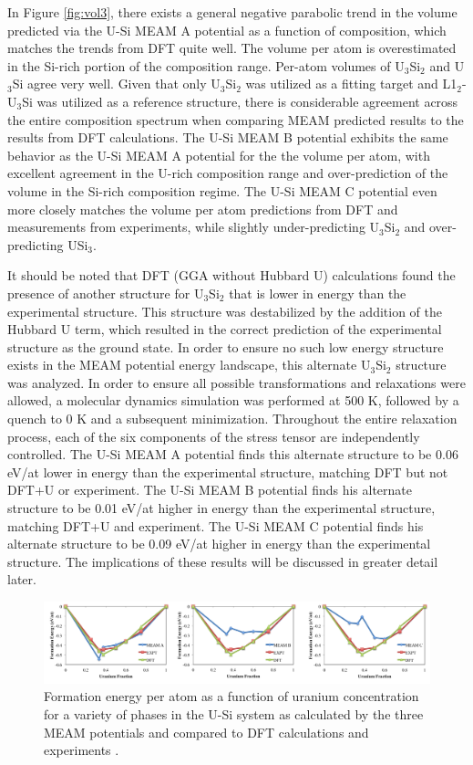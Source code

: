 \documentclass[review]{elsarticle}
\begin{document}
In  Figure \ref{fig:vol3}, there exists a general negative parabolic trend in the volume predicted via the U-Si MEAM A potential as a function of composition, which matches the trends from DFT quite well.  The volume per atom is overestimated in the Si-rich portion of the composition range.  Per-atom volumes of U$_{3}$Si$_{2}$ and U$_{3}$Si agree very well.  Given that only U$_{3}$Si$_{2}$ was utilized as a fitting target and L1$_{2}$-U$_{3}$Si was utilized as a reference structure, there is considerable agreement across the entire composition spectrum when comparing MEAM predicted results to the results from DFT calculations.   The U-Si MEAM B potential exhibits the same behavior as the U-Si MEAM A potential for the the volume per atom, with excellent agreement in the U-rich composition range and over-prediction of the volume in the Si-rich composition regime.  The U-Si MEAM C potential even more closely matches the volume per atom predictions from DFT and measurements from experiments, while slightly under-predicting U$_{3}$Si$_{2}$ and over-predicting USi$_{3}$.

It should be noted that DFT (GGA without Hubbard U) calculations \cite{noordhoek2016} found the presence of another structure for U$_{3}$Si$_{2}$ that is lower in energy than the experimental structure.  This structure was destabilized by the addition of the Hubbard U term, which resulted in the correct prediction of the experimental structure as the ground state.  In order to ensure no such low energy structure exists in the MEAM potential energy landscape, this alternate U$_{3}$Si$_{2}$ structure was analyzed.  In order to ensure all possible transformations and relaxations were allowed, a molecular dynamics simulation was performed at 500 K, followed by a quench to 0 K and a subsequent minimization.  Throughout the entire relaxation process, each of the six components of the stress tensor are independently controlled.  The U-Si MEAM A potential finds this alternate structure to be 0.06 eV/at lower in energy than the experimental structure, matching DFT but not DFT+U or experiment.  The U-Si MEAM B potential finds his alternate structure to be 0.01 eV/at higher in energy than the experimental structure, matching DFT+U and experiment.  The U-Si MEAM C potential finds his alternate structure to be 0.09 eV/at higher in energy than the experimental structure.  The implications of these results will be discussed in greater detail later.

\begin{figure}[hbt]
	\centering
	\includegraphics[width=\textwidth]{eform3.png}
    \caption{Formation energy per atom as a function of uranium concentration for a variety of phases in the U-Si system as calculated by the three MEAM potentials and compared to DFT calculations \cite{noordhoek2016} and experiments \cite{berche2009}.}\label{fig:eform3}
\end{figure}
\end{document}
